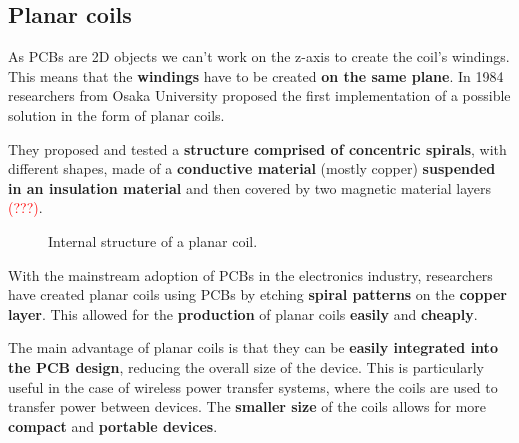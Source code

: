 \subsection{Planar coils}
As PCBs are 2D objects we can't work on the z-axis to create the coil's windings. This means that the \textbf{windings} have to be created \textbf{on the same plane}. 
In 1984 researchers from Osaka University proposed the first implementation of a possible solution in the form of planar coils.

\begin{samepage}
    They proposed and tested a \textbf{structure comprised of concentric spirals}, with different shapes, made of a \textbf{conductive material} (mostly copper) \textbf{suspended in an insulation material} and then covered by two magnetic material layers \textcolor{red}{(???)}\cite{OG_plan_coils}. %
    \nopagebreak

    \begin{figure}[H]
        \centering
        
        \caption{Internal structure of a planar coil.}
        \label{fig:Planar_coil_structure}
    \end{figure}
\end{samepage}

With the mainstream adoption of PCBs in the electronics industry, researchers have created planar coils using PCBs by etching \textbf{spiral patterns} on the \textbf{copper layer}. This allowed for the \textbf{production} of planar coils \textbf{easily} and \textbf{cheaply}.

The main advantage of planar coils is that they can be \textbf{easily integrated into the PCB design}, reducing the overall size of the device. This is particularly useful in the case of wireless power transfer systems, where the coils are used to transfer power between devices. The \textbf{smaller size} of the coils allows for more \textbf{compact} and \textbf{portable devices}.

